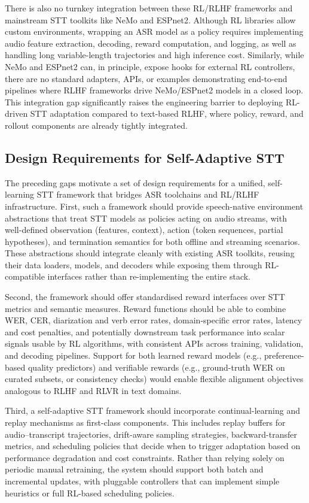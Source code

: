 \documentclass[conference]{IEEEtran}
\begin{document}
There is also no turnkey integration between these RL/RLHF frameworks and mainstream STT toolkits like NeMo and ESPnet2.
Although RL libraries allow custom environments, wrapping an ASR model as a policy requires implementing audio feature extraction, decoding, reward computation, and logging, as well as handling long variable-length trajectories and high inference cost.
Similarly, while NeMo and ESPnet2 can, in principle, expose hooks for external RL controllers, there are no standard adapters, APIs, or examples demonstrating end-to-end pipelines where RLHF frameworks drive NeMo/ESPnet2 models in a closed loop.
This integration gap significantly raises the engineering barrier to deploying RL-driven STT adaptation compared to text-based RLHF, where policy, reward, and rollout components are already tightly integrated.

\subsection{Design Requirements for Self-Adaptive STT}

The preceding gaps motivate a set of design requirements for a unified, self-learning STT framework that bridges ASR toolchains and RL/RLHF infrastructure.
First, such a framework should provide speech-native environment abstractions that treat STT models as policies acting on audio streams, with well-defined observation (features, context), action (token sequences, partial hypotheses), and termination semantics for both offline and streaming scenarios.
These abstractions should integrate cleanly with existing ASR toolkits, reusing their data loaders, models, and decoders while exposing them through RL-compatible interfaces rather than re-implementing the entire stack.

Second, the framework should offer standardised reward interfaces over STT metrics and semantic measures.
Reward functions should be able to combine WER, CER, diarization and verb error rates, domain-specific error rates, latency and cost penalties, and potentially downstream task performance into scalar signals usable by RL algorithms, with consistent APIs across training, validation, and decoding pipelines.
Support for both learned reward models (e.g., preference-based quality predictors) and verifiable rewards (e.g., ground-truth WER on curated subsets, or consistency checks) would enable flexible alignment objectives analogous to RLHF and RLVR in text domains.

Third, a self-adaptive STT framework should incorporate continual-learning and replay mechanisms as first-class components.
This includes replay buffers for audio–transcript trajectories, drift-aware sampling strategies, backward-transfer metrics, and scheduling policies that decide when to trigger adaptation based on performance degradation and cost constraints.
Rather than relying solely on periodic manual retraining, the system should support both batch and incremental updates, with pluggable controllers that can implement simple heuristics or full RL-based scheduling policies.
\end{document}
